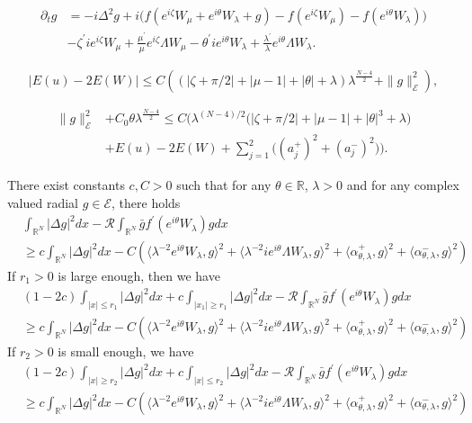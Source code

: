 \documentclass[10pt,a4paper]{amsart}
\newcommand{\R}{\mathbb{R}}
\begin{document}
\begin{align}
\label{eqdeg}
\partial_t g &=-i \Delta^2 g +i\big(f(e^{i\zeta} W_\mu +e^{i\theta} W_\lambda +g) - f(e^{i\zeta} W_\mu ) - f(e^{i\theta }W_\lambda)\big)\\
&-  \zeta^\prime i e^{i\zeta} W_\mu + \frac{\mu^\prime}{\mu} e^{i\zeta}\Lambda W_\mu -\theta^\prime i e^{i\theta} W_\lambda + \frac{\lambda^\prime}{\lambda}e^{i\theta} \Lambda W_\lambda  .\nonumber
\end{align}

\begin{equation}
\label{propenere1}
|E(u)-2E(W)|\leq C \left((|\zeta +\pi /2| +|\mu -1| +|\theta| +\lambda )\lambda^{\frac{N-4}{2}} +\|g\|_{\mathcal{E}}^2 \right), 
\end{equation}

\begin{align}
\label{propenere2}
\|g\|_{\mathcal{E}}^2 &+C_0 \theta \lambda^{\frac{N-4}{2}} \leq C \Big(\lambda^{(N-4)/2} \big(|\zeta +\pi /2| +|\mu -1|+|\theta|^3 +\lambda\big) \nonumber\\
&+E(u) - 2E(W) +\sum_{j=1}^2 \big((a_j^+)^2 + (a_j^- )^2 \big)\Big).
\end{align}

\begin{prop}
\label{propcoer111}
There exist constants $c,C>0$ such that for any $\theta \in \R$, $\lambda >0$ and for any complex valued radial $g\in \mathcal{E}$, there holds
\begin{align*}
&\int_{\R^N} |\Delta g|^2 dx - \mathcal{R} \int_{\R^N} \bar{g} f^\prime (e^{i\theta} W_\lambda) g dx\\
& \geq c \int_{\R^N} |\Delta g|^2 dx - C (\langle \lambda^{-2} e^{i\theta} W_\lambda , g\rangle^2 + \langle \lambda^{-2} i e^{i\theta} \Lambda W_\lambda ,g \rangle^2 +\langle \alpha_{\theta ,\lambda}^+ ,g \rangle^2 +\langle \alpha_{\theta ,\lambda}^- ,g\rangle^2)
\end{align*}
If $r_1 >0$ is large enough, then we have
\begin{align*}
&(1-2c)\int_{|x|\leq r_1} |\Delta g|^2 dx+c \int_{|x_1| \geq r_1} |\Delta g|^2 dx - \mathcal{R} \int_{\R^N} \bar{g} f^\prime (e^{i\theta} W_\lambda) g dx\\
& \geq c \int_{\R^N} |\Delta g|^2 dx - C (\langle \lambda^{-2} e^{i\theta} W_\lambda , g\rangle^2 + \langle \lambda^{-2} i e^{i\theta} \Lambda W_\lambda ,g \rangle^2 +\langle \alpha_{\theta ,\lambda}^+ ,g \rangle^2 +\langle \alpha_{\theta ,\lambda}^- ,g\rangle^2)
\end{align*}
If $r_2>0$ is small enough, we have
\begin{align*}
&(1-2c)\int_{|x|\geq r_2} |\Delta g|^2 dx+c\int_{|x|\leq r_2} |\Delta g|^2 dx - \mathcal{R} \int_{\R^N} \bar{g} f^\prime (e^{i\theta} W_\lambda) g dx\\
& \geq c \int_{\R^N} |\Delta g|^2 dx - C (\langle \lambda^{-2} e^{i\theta} W_\lambda , g\rangle^2 + \langle \lambda^{-2} i e^{i\theta} \Lambda W_\lambda ,g \rangle^2 +\langle \alpha_{\theta ,\lambda}^+ ,g \rangle^2 +\langle \alpha_{\theta ,\lambda}^- ,g\rangle^2)
\end{align*}

\end{prop}
\end{document}

